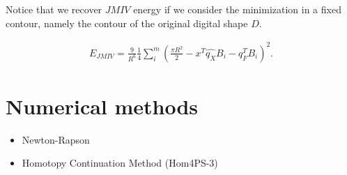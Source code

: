 Notice that we recover $JMIV$ energy if we consider the minimization in a fixed contour, namely the contour of the original digital shape $D$.

\begin{align*}
	E_{JMIV} = \frac{9}{R^6}\frac{1}{4}\sum_{i}^{m}{\left( \frac{\pi R^2}{2} - x^T\hat{q_X}B_i - q_F^TB_i \right)^2}.
\end{align*}

\section{Numerical methods}

\begin{itemize}
	\item{Newton-Rapson}
	\item{Homotopy Continuation Method (Hom4PS-3)}
\end{itemize}


